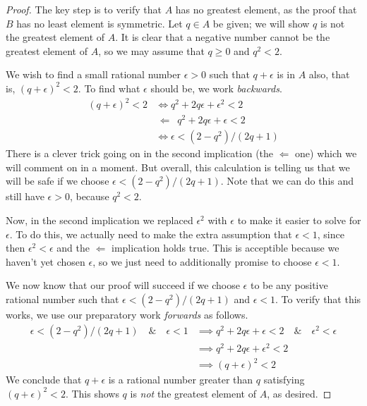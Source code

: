 \documentclass[11pt,oneside]{amsbook}
\theoremstyle{definition}
\theoremstyle{plain}
\theoremstyle{definition}
\theoremstyle{remark}
\numberwithin{equation}{section}
\numberwithin{figure}{section}
\begin{document}
\begin{proof}
  The key step is to verify that $A$ has no greatest element, as the proof that $B$ has no least element is symmetric. Let $q\in A$ be given; we will show $q$ is not the greatest element of $A$. It is clear that a negative number cannot be the greatest element of $A$, so we may assume that $q\geq0$ and $q^2<2$.
  
  We wish to find a small rational number $\epsilon>0$ such that $q+\epsilon$ is in $A$ also, that is, $(q+\epsilon)^2<2$. To find what $\epsilon$ should be, we work \emph{backwards}.
  \begin{align*}
    (q+\epsilon)^2<2&\iff q^2+2q\epsilon+\epsilon^2<2\\
    &\,\Longleftarrow\,\,\, q^2+2q\epsilon+\epsilon<2\\
    &\iff \epsilon<(2-q^2)/(2q+1)
  \end{align*}
  There is a clever trick going on in the second implication (the $\Longleftarrow$ one) which we will comment on in a moment. But overall, this calculation is telling us that we will be safe if we choose $\epsilon<(2-q^2)/(2q+1)$. Note that we can do this and still have $\epsilon>0$, because $q^2<2$.

  Now, in the second implication we replaced $\epsilon^2$ with $\epsilon$ to make it easier to solve for $\epsilon$. To do this, we actually need to make the extra assumption that $\epsilon<1$, since then $\epsilon^2<\epsilon$ and the $\Longleftarrow$ implication holds true. This is acceptible because we haven't yet chosen $\epsilon$, so we just need to additionally promise to choose $\epsilon<1$.

  We now know that our proof will succeed if we choose $\epsilon$ to be any positive rational number such that $\epsilon<(2-q^2)/(2q+1)$ and $\epsilon<1$. To verify that this works, we use our preparatory work \emph{forwards} as follows.
  \begin{align*}
    \epsilon<(2-q^2)/(2q+1)\quad\&\quad\epsilon<1
    &\implies q^2+2q\epsilon+\epsilon<2\quad\&\quad\epsilon^2<\epsilon\\
    &\implies q^2+2q\epsilon+\epsilon^2<2\\
    &\implies (q+\epsilon)^2<2
  \end{align*}
  We conclude that $q+\epsilon$ is a rational number greater than $q$ satisfying $(q+\epsilon)^2<2$. This shows $q$ is \emph{not} the greatest element of $A$, as desired.
\end{proof}
\end{document}
